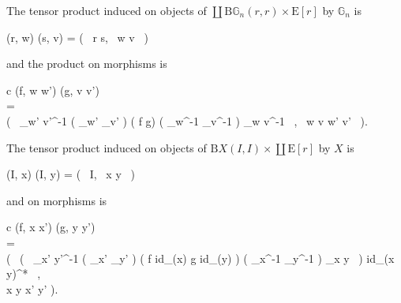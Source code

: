 \documentclass{amsart} %
\newenvironment{eq*}{\begin{equation*}}{\end{equation*}}
\begin{document}
\begin{cor}\label{tenscor} The tensor product induced on objects of $\coprod \mathrm{B}\mathbb{G}_n(r, r) \times \mathrm{E}[r]$ by $\mathbb{G}_n$ is
\begin{eq*} (r, w) \otimes (s, v) = ( \, r \boxtimes s, \, w \otimes v \, ) \end{eq*}
and the product on morphisms is
\begin{eq*} \begin{array}{c}
		(f, w \to w') \otimes (g, v \to v') \\
		= \\
		\big( \, \rho_{w' \otimes v'}^{-1} \circ ( \rho_{w'} \otimes \rho_{v'} ) \circ ( f \otimes g) \circ ( \rho_{w}^{-1} \otimes \rho_{v}^{-1} ) \circ \rho_{w \otimes v}^{-1} \, , \, w \otimes v \to w' \otimes v' \, \big). 
		\end{array}
\end{eq*}
The tensor product induced on objects of $\mathrm{B}X(I,I) \times \coprod \mathrm{E}[r]$ by $X$ is
\begin{eq*} (I, x) \otimes (I, y) = ( \, I, \, x \otimes y \, ) \end{eq*}
and on morphisms is
\begin{eq*}\begin{array}{c}
		(f, x \to x') \otimes (g, y \to y') \\
		= \\
		\Big( \, \big( \, \rho_{x' \otimes y'}^{-1} \circ ( \rho_{x'} \otimes \rho_{y'} ) \circ ( f \otimes id_{(x)} \otimes g \otimes id_{(y)} ) \circ ( \rho_{x}^{-1} \otimes \rho_{y}^{-1} ) \circ \rho_{x \otimes y} \, \big) \otimes id_{(x \otimes y)^*} \, , \\
		\quad x \otimes y \to x' \otimes y' \Big).
		\end{array}
\end{eq*}
\end{cor}
\end{document}
